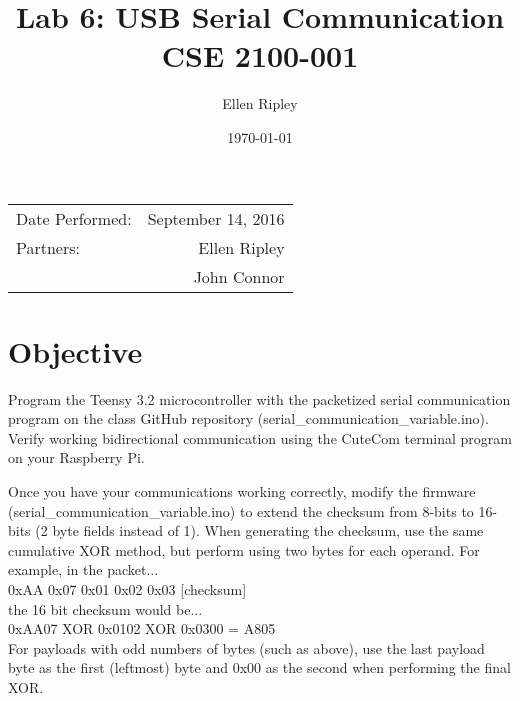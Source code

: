 \documentclass{article}
\title{Lab 6: USB Serial Communication \\ CSE 2100-001} %
\author{Ellen Ripley} %
\date{\today} %
\begin{document}
\maketitle %

\begin{center}
\begin{tabular}{l r}
Date Performed: & September 14, 2016 \\ %
Partners: & Ellen Ripley \\ %
& John Connor \\
\end{tabular}
\end{center}



\section{Objective}

Program the Teensy 3.2 microcontroller with the packetized serial communication program on the class GitHub repository (serial\_communication\_variable.ino). Verify working bidirectional communication using the CuteCom terminal program on your Raspberry Pi.

Once you have your communications working correctly, modify the firmware (serial\_communication\_variable.ino) to extend the checksum from 8-bits to 16-bits (2 byte fields instead of 1). When generating the checksum, use the same cumulative XOR method, but perform using two bytes for each operand. For example, in the packet... \\

0xAA 0x07 0x01 0x02 0x03 [checksum]\\

the 16 bit checksum would be...\\

0xAA07 XOR 0x0102 XOR 0x0300 = A805\\

For payloads with odd numbers of bytes (such as above), use the last payload byte as the first (leftmost) byte and 0x00 as the second when performing the final XOR.
\end{document}
